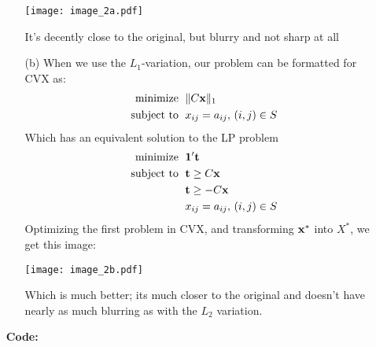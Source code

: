 \documentclass[11pt]{article}
\theoremstyle{definition}
\begin{document}
\begin{itemize}
\begin{itemize}
                \begin{center}
                    \texttt{[image: image\_2a.pdf]}
                \end{center}
                It's decently close to the original, but blurry and not sharp at all
            \item[(b)]
                When we use the $L_1$-variation, our problem can be formatted for CVX as: 
                \begin{align*}
                    \text{minimize    }\; & \|C{\bf x}\|_1 \\
                    \text{subject to  }\; & x_{ij}=a_{ij},\, (i,j)\in S  \\
                \end{align*}
                Which has an equivalent solution to the LP problem  
                \begin{align*}
                    \text{minimize    }\; & {\bf 1}'{\bf t} \\
                    \text{subject to  }\; & {\bf t}\geq C{\bf x} \\
                                          & {\bf t}\geq -C{\bf x} \\  
                                          & x_{ij}=a_{ij},\, (i,j)\in S  \\
                \end{align*}
                Optimizing the first problem in CVX, and transforming ${\bf x}^*$ into $X^*$, we get this image:
                \begin{center}
                    \texttt{[image: image\_2b.pdf]}
                \end{center}
                Which is much better; its much closer to the original and doesn't have nearly as much blurring as with the $L_2$ variation.
        \end{itemize}

        {\bf Code:} \\
        


\end{itemize}
\end{document}
